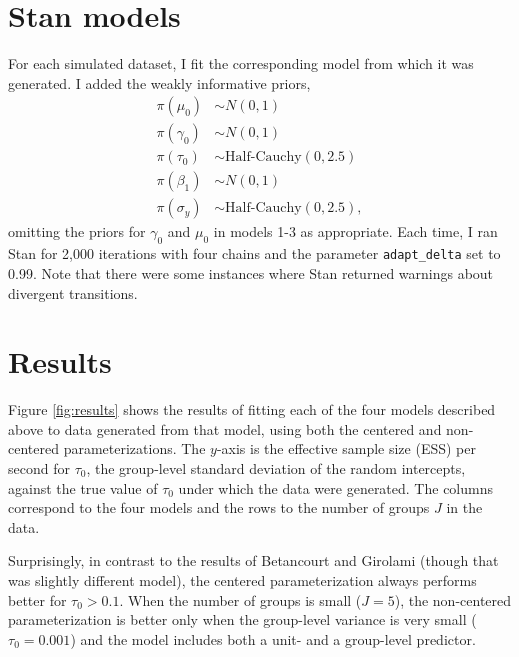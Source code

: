 \documentclass[10pt,a4paper]{article}
\begin{document}
\section*{Stan models}
For each simulated dataset, I fit the corresponding model from which it was generated. I added the weakly informative priors,
\begin{align*}
	\pi(\mu_0) &\sim N(0, 1) \\
	\pi(\gamma_0) &\sim N(0, 1) \\
	\pi(\tau_0) &\sim \text{Half-Cauchy}(0, 2.5) \\
	\pi(\beta_1) &\sim N(0, 1) \\
	\pi(\sigma_y) &\sim \text{Half-Cauchy}(0, 2.5),
\end{align*}
omitting the priors for $\gamma_0$ and $\mu_0$ in models 1-3 as appropriate. Each time, I ran Stan for 2,000 iterations with four chains and the parameter \texttt{adapt\_delta} set to 0.99. Note that there were some instances where Stan returned warnings about divergent transitions.

\section*{Results}
Figure \ref{fig:results} shows the results of fitting each of the four models described above to data generated from that model, using both the centered and non-centered parameterizations. The $y$-axis is the effective sample size (ESS) per second for $\tau_0$, the group-level standard deviation of the random intercepts, against the true value of $\tau_0$ under which the data were generated. The columns correspond to the four models and the rows to the number of groups $J$ in the data.

Surprisingly, in contrast to the results of Betancourt and Girolami (though that was slightly different model), the centered parameterization always performs better for $\tau_0 > 0.1$. When the number of groups is small ($J = 5$), the non-centered parameterization is better only when the group-level variance is very small ($\tau_0 = 0.001$) and the model includes both a unit- and a group-level predictor.
\end{document}

